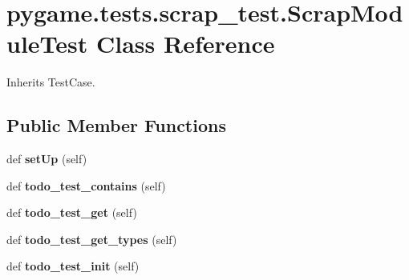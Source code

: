 \hypertarget{classpygame_1_1tests_1_1scrap__test_1_1_scrap_module_test}{}\section{pygame.\+tests.\+scrap\+\_\+test.\+Scrap\+Module\+Test Class Reference}
\label{classpygame_1_1tests_1_1scrap__test_1_1_scrap_module_test}


Inherits Test\+Case.

\subsection*{Public Member Functions}
\begin{DoxyCompactItemize}
\item 
\mbox{\label{classpygame_1_1tests_1_1scrap__test_1_1_scrap_module_test_a1ed16cf66a6ae4bdff0b2867253afc3d}} 
def {\bfseries set\+Up} (self)
\item 
\mbox{\label{classpygame_1_1tests_1_1scrap__test_1_1_scrap_module_test_ab689800deb60e421e19e61d5688fe342}} 
def {\bfseries todo\+\_\+test\+\_\+contains} (self)
\item 
\mbox{\label{classpygame_1_1tests_1_1scrap__test_1_1_scrap_module_test_a2c449a7d7e5ca3be376a9984f5e6c892}} 
def {\bfseries todo\+\_\+test\+\_\+get} (self)
\item 
\mbox{\label{classpygame_1_1tests_1_1scrap__test_1_1_scrap_module_test_acd1d5287563f9279903d3d7c4b6f6a56}} 
def {\bfseries todo\+\_\+test\+\_\+get\+\_\+types} (self)
\item 
\mbox{\label{classpygame_1_1tests_1_1scrap__test_1_1_scrap_module_test_a71006a0a1323435f588bf1e1ad28663a}} 
def {\bfseries todo\+\_\+test\+\_\+init} (self)
\item 
\mbox{\label{classpygame_1_1tests_1_1scrap__test_1_1_scrap_module_test_a1251e284c25021ec020fb48e567aa65c}} 

\end{DoxyCompactItemize}

